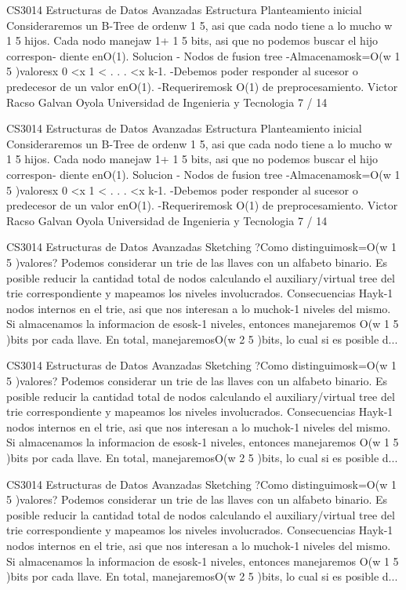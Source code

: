 \begin{description}[leftmargin=!,labelwidth=4.2em,style=nextline]
\item[Pag. 24] CS3014 Estructuras de Datos Avanzadas Estructura Planteamiento inicial Consideraremos un B-Tree de ordenw 1 5, asi que cada nodo tiene a lo mucho w 1 5 hijos. Cada nodo manejaw 1+ 1 5 bits, asi que no podemos buscar el hijo correspon- diente enO(1). Solucion - Nodos de fusion tree -Almacenamosk=O(w 1 5 )valoresx 0 <x 1 < . . . <x k-1. -Debemos poder responder al sucesor o predecesor de un valor enO(1). -Requeriremosk O(1) de preprocesamiento. Victor Racso Galvan Oyola Universidad de Ingenieria y Tecnologia 7 / 14
\item[Pag. 25] CS3014 Estructuras de Datos Avanzadas Estructura Planteamiento inicial Consideraremos un B-Tree de ordenw 1 5, asi que cada nodo tiene a lo mucho w 1 5 hijos. Cada nodo manejaw 1+ 1 5 bits, asi que no podemos buscar el hijo correspon- diente enO(1). Solucion - Nodos de fusion tree -Almacenamosk=O(w 1 5 )valoresx 0 <x 1 < . . . <x k-1. -Debemos poder responder al sucesor o predecesor de un valor enO(1). -Requeriremosk O(1) de preprocesamiento. Victor Racso Galvan Oyola Universidad de Ingenieria y Tecnologia 7 / 14
\item[Pag. 26] CS3014 Estructuras de Datos Avanzadas Sketching ?Como distinguimosk=O(w 1 5 )valores? Podemos considerar un trie de las llaves con un alfabeto binario. Es posible reducir la cantidad total de nodos calculando el auxiliary/virtual tree del trie correspondiente y mapeamos los niveles involucrados. Consecuencias Hayk-1 nodos internos en el trie, asi que nos interesan a lo muchok-1 niveles del mismo. Si almacenamos la informacion de esosk-1 niveles, entonces manejaremos O(w 1 5 )bits por cada llave. En total, manejaremosO(w 2 5 )bits, lo cual si es posible d...
\item[Pag. 27] CS3014 Estructuras de Datos Avanzadas Sketching ?Como distinguimosk=O(w 1 5 )valores? Podemos considerar un trie de las llaves con un alfabeto binario. Es posible reducir la cantidad total de nodos calculando el auxiliary/virtual tree del trie correspondiente y mapeamos los niveles involucrados. Consecuencias Hayk-1 nodos internos en el trie, asi que nos interesan a lo muchok-1 niveles del mismo. Si almacenamos la informacion de esosk-1 niveles, entonces manejaremos O(w 1 5 )bits por cada llave. En total, manejaremosO(w 2 5 )bits, lo cual si es posible d...
\item[Pag. 28] CS3014 Estructuras de Datos Avanzadas Sketching ?Como distinguimosk=O(w 1 5 )valores? Podemos considerar un trie de las llaves con un alfabeto binario. Es posible reducir la cantidad total de nodos calculando el auxiliary/virtual tree del trie correspondiente y mapeamos los niveles involucrados. Consecuencias Hayk-1 nodos internos en el trie, asi que nos interesan a lo muchok-1 niveles del mismo. Si almacenamos la informacion de esosk-1 niveles, entonces manejaremos O(w 1 5 )bits por cada llave. En total, manejaremosO(w 2 5 )bits, lo cual si es posible d...

\end{description}
